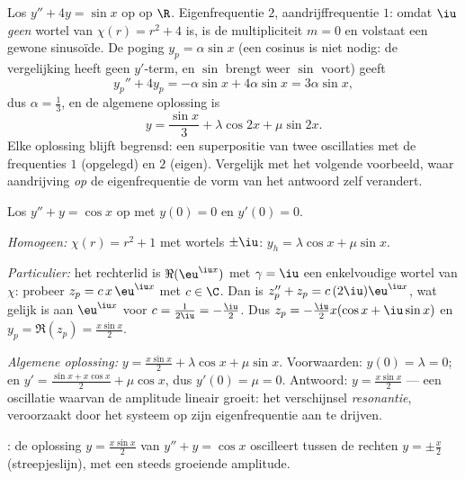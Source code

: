 \begin{example}\label{ex:b1:diffeq:offresonance}
Los $y'' + 4y = \sin x$ op op $\R$. Eigenfrequentie $2$, aandrijffrequentie
$1$: omdat $\iu$ \emph{geen} wortel van $\chi(r) = r^2 + 4$ is, is de
multipliciteit $m = 0$ en volstaat een gewone sinusoïde. De poging $y_p =
\alpha\sin x$ (een cosinus is niet nodig: de vergelijking heeft geen
$y'$-term, en $\sin$ brengt weer $\sin$ voort) geeft
\[
y_p'' + 4y_p = -\alpha\sin x + 4\alpha\sin x = 3\alpha\sin x ,
\]
dus $\alpha = \frac13$, en de algemene oplossing is
\[
y = \frac{\sin x}3 + \lambda\cos 2x + \mu\sin 2x .
\]
Elke oplossing blijft begrensd: een superpositie van twee oscillaties met
de frequenties $1$ (opgelegd) en $2$ (eigen). Vergelijk met het volgende
voorbeeld, waar aandrijving \emph{op} de eigenfrequentie de vorm van het
antwoord zelf verandert.
\end{example}

\begin{example}\label{ex:b1:diffeq:oscillation}
Los $y'' + y = \cos x$ op met $y(0) = 0$ en $y'(0) = 0$.

\emph{Homogeen:} $\chi(r) = r^2 + 1$ met wortels $\pm\iu$: $y_h =
\lambda\cos x + \mu \sin x$.

\emph{Particulier:} het rechterlid is $\Re(\eu^{\iu x})$ met $\gamma =
\iu$ een enkelvoudige wortel van $\chi$: probeer $z_p = c\, x\, \eu^{\iu
x}$ met $c \in \C$. Dan is $z_p'' + z_p = c\,(2\iu)\eu^{\iu x}$, wat
gelijk is aan $\eu^{\iu x}$ voor $c = \frac{1}{2\iu} = -\frac\iu2$. Dus
$z_p = -\frac{\iu}{2} x (\cos x + \iu \sin x)$ en $y_p = \Re(z_p) =
\frac{x \sin x}{2}$.

\emph{Algemene oplossing:} $y = \frac{x\sin x}{2} + \lambda\cos x +
\mu\sin x$. Voorwaarden: $y(0) = \lambda = 0$; en $y' = \frac{\sin x + x\cos
x}{2} + \mu\cos x$, dus $y'(0) = \mu = 0$. Antwoord: $y = \frac{x\sin
x}{2}$ --- een oscillatie waarvan de amplitude lineair groeit: het
verschijnsel \emph{resonantie}, veroorzaakt door het
systeem op zijn eigenfrequentie aan te drijven.
\end{example}

\begin{omfigure}

{\small {}: de oplossing $y = \frac{x \sin x}{2}$ van $y'' + y =
\cos x$ oscilleert tussen de rechten $y = \pm\frac x2$ (streepjeslijn),
met een steeds groeiende amplitude.}
\end{omfigure}

